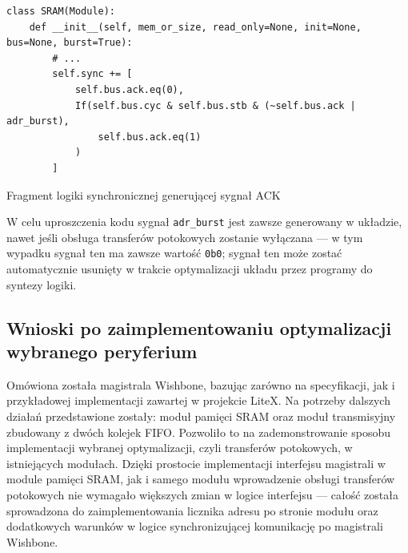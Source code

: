 \begin{longlisting}
\begin{verbatim}
class SRAM(Module):
    def __init__(self, mem_or_size, read_only=None, init=None, bus=None, burst=True):
        # ...
        self.sync += [
            self.bus.ack.eq(0),
            If(self.bus.cyc & self.bus.stb & (~self.bus.ack | adr_burst),
                self.bus.ack.eq(1)
            )
        ]
\end{verbatim}
\caption{Fragment logiki synchronicznej generującej sygnał ACK}
\label{lst:impl-sram-ack}
\end{longlisting}

W celu uproszczenia kodu sygnał \texttt{adr_burst} jest zawsze generowany w układzie, nawet jeśli obsługa transferów potokowych zostanie wyłączana --- w tym wypadku sygnał ten ma zawsze wartość \texttt{0b0}; sygnał ten może zostać automatycznie usunięty w trakcie optymalizacji układu przez programy do syntezy logiki.

\subsection{Wnioski po zaimplementowaniu optymalizacji wybranego peryferium}

Omówiona została magistrala Wishbone, bazując zarówno na specyfikacji, jak i przykładowej implementacji zawartej w projekcie LiteX.
Na potrzeby dalszych działań przedstawione zostały: moduł pamięci SRAM oraz moduł transmisyjny zbudowany z dwóch kolejek FIFO. Pozwoliło to na zademonstrowanie sposobu implementacji wybranej optymalizacji, czyli transferów potokowych, w istniejących modułach.
Dzięki prostocie implementacji interfejsu magistrali w module pamięci SRAM, jak i samego modułu wprowadzenie obsługi transferów potokowych nie wymagało większych zmian w logice interfejsu --- całość została sprowadzona do zaimplementowania licznika adresu po stronie modułu oraz dodatkowych warunków w logice synchronizującej komunikację po magistrali Wishbone.
